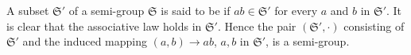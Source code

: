 A subset $\mathfrak{S}'$ of a semi-group $\mathfrak{S}$ is said to be  if $ab \in \mathfrak{S}'$ for every $a$ and $b$ in $\mathfrak{S}'$. It is clear that the associative law holds in $\mathfrak{S}'$. Hence the pair $(\mathfrak{S}', \cdot)$ consisting of $\mathfrak{S}'$ and the induced mapping $(a, b) \to ab$, $a, b$ in $\mathfrak{S}'$, is a semi-group.
